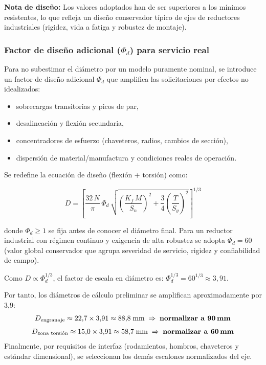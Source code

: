 \documentclass[conference]{IEEEtran}
\begin{document}
\textbf{Nota de diseño:} Los valores adoptados han de ser superiores a los mínimos
resistentes, lo que refleja un diseño conservador típico de ejes de reductores industriales
(rigidez, vida a fatiga y robustez de montaje).

\subsubsection{Factor de diseño adicional ($\Phi_d$) para servicio real}

Para no subestimar el diámetro por un modelo puramente nominal, se introduce un factor
de diseño adicional $\Phi_d$ que amplifica las solicitaciones por efectos no idealizados:

\begin{itemize}
    \item sobrecargas transitorias y picos de par,
    \item desalineación y flexión secundaria,
    \item concentradores de esfuerzo (chaveteros, radios, cambios de sección),
    \item dispersión de material/manufactura y condiciones reales de operación.
\end{itemize}

Se redefine la ecuación de diseño (flexión + torsión) como:

\begin{equation}
D=\left[\frac{32\,N}{\pi}\,\Phi_d\,
\sqrt{\left(\frac{K_f\,M}{S_n}\right)^2
+\frac{3}{4}\left(\frac{T}{S_y}\right)^2}
\right]^{1/3}
\label{eq:D_con_factor_adicional}
\end{equation}

donde $\Phi_d \ge 1$ se fija antes de conocer el diámetro final. Para un reductor
industrial con régimen continuo y exigencia de alta robustez se adopta $\Phi_d = 60$
(valor global conservador que agrupa severidad de servicio, rigidez y confiabilidad de
campo).

Como $D \propto \Phi_d^{1/3}$, el factor de escala en diámetro es:
$\Phi_d^{1/3} = 60^{1/3} \approx 3{,}91$.

Por tanto, los diámetros de cálculo preliminar se amplifican aproximadamente por 3{,}9:
\small\begin{equation}
\begin{gathered}
D_{\text{engranaje}} \approx 22{,}7 \times 3{,}91 \approx 88{,}8\;\text{mm}
  \;\Rightarrow\; \textbf{normalizar a 90\,mm} \\[4pt]
D_{\text{zona torsión}} \approx 15{,}0 \times 3{,}91 \approx 58{,}7\;\text{mm}
  \;\Rightarrow\; \textbf{normalizar a 60\,mm}
\end{gathered}
\end{equation}
Finalmente, por requisitos de interfaz (rodamientos, hombros, chaveteros y estándar
dimensional), se seleccionan los demás escalones normalizados del eje.
\end{document}
